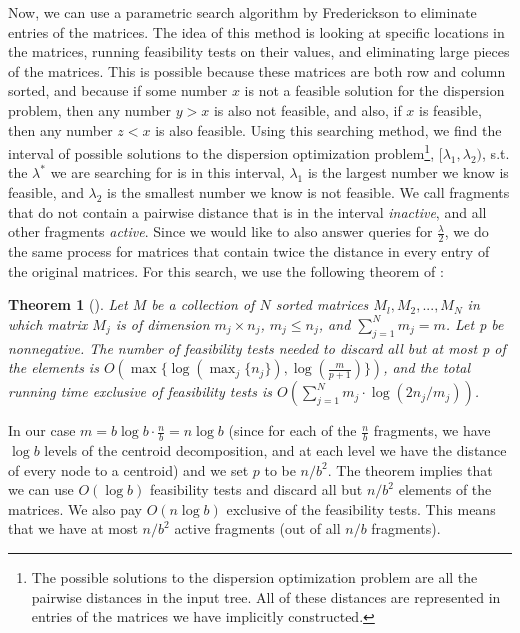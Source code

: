 \documentclass[11pt,a4paper]{article}
\newtheorem{theorem}{Theorem}[section]
\theoremstyle{definition}
\theoremstyle{remark}
\begin{document}
Now, we can use a parametric search algorithm by Frederickson to eliminate entries of the matrices. The idea of this method is looking at specific locations in the matrices, running feasibility tests on their values, and eliminating large pieces of the matrices. This is possible because these matrices are both row and column sorted, and because if some number $x$ is not a feasible solution for the dispersion problem, then any number $y>x$ is also not feasible, and also, if $x$ is feasible, then any number $z<x$ is also feasible. Using this searching method, we find the interval of possible solutions to the dispersion optimization problem\footnote{The possible solutions to the dispersion optimization problem are all the pairwise distances in the input tree. All of these distances are represented in entries of the matrices we have implicitly constructed.}, $[\lambda_1,\lambda_2)$, s.t. the $\lambda^*$ we are searching for is in this interval, $\lambda_1$ is the largest number we know is feasible, and $\lambda_2$ is the smallest number we know is not feasible. We call fragments that do not contain a pairwise distance that is in the interval \textit{inactive}, and all other fragments \textit{active}. Since we would like to also answer queries for $\frac{\lambda}{2}$, we do the same process for matrices that contain twice the distance in every entry of the original matrices.
For this search, we use the following theorem of \cite{Frederickson1991}:
\begin{theorem}[\cite{Frederickson1991}]\label{Frederickson's theorem}
Let $M$ be a collection of $N$ sorted matrices ${M_l, M_2, . . . , M_N}$ in which matrix $M_j$ is of dimension $m_j \times n_j$, $m_j \leq n_j$, and $\sum_{j=1}^{N} m_j = m$.
Let p be nonnegative. The number of feasibility tests needed to discard all but at most p of the elements is $O(\max \lbrace \log(\max_{j} \lbrace n_j \rbrace), \log(\frac{m}{p+1}) \rbrace)$, and the total running time exclusive of feasibility tests is $O(\sum_{j=1}^{N} m_j \cdot \log (2n_j/m_j))$.
\end{theorem}
In our case $m=b \log b \cdot \frac{n}{b} = n \log b$ (since for each of the $\frac{n}{b}$ fragments, we have $\log b$ levels of the centroid decomposition, and at each level we have the distance of every node to a centroid) and we set $p$ to be $n/b^2$. The theorem implies that we can use $O(\log b)$ feasibility tests and discard all but $n/b^2$ elements of the matrices. We also pay $O(n \log b)$ exclusive of the feasibility tests. This means that we have at most $n/b^2$ active fragments (out of all $n/b$ fragments). 
\end{document}
